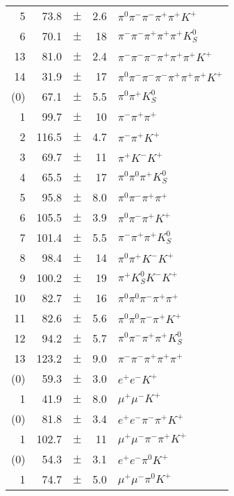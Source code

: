 \begin{center}
\begin{tabular}{|rrcrl|}
5       & 73.8  & $\pm$ & 2.6   & $\pi^0 \pi^- \pi^- \pi^+ \pi^+ K^+ $ \\
6       & 70.1  & $\pm$ & 18    & $\pi^- \pi^- \pi^+ \pi^+ \pi^+ K_S^0 $ \\
13      & 81.0  & $\pm$ & 2.4   & $\pi^- \pi^- \pi^- \pi^+ \pi^+ \pi^+ K^+ $ \\
14      & 31.9  & $\pm$ & 17    & $\pi^0 \pi^- \pi^- \pi^- \pi^+ \pi^+ \pi^+ K^+ $ \\
\hline                     
[15](0) & 67.1  & $\pm$ & 5.5   & $\pi^0 \pi^+ K_S^0 $ \\
1       & 99.7  & $\pm$ & 10    & $\pi^- \pi^+ \pi^+ $ \\
2       &116.5  & $\pm$ & 4.7   & $\pi^- \pi^+ K^+ $ \\
3       & 69.7  & $\pm$ & 11    & $\pi^+ K^- K^+ $ \\
4       & 65.5  & $\pm$ & 17    & $\pi^0 \pi^0 \pi^+ K_S^0 $ \\
5       & 95.8  & $\pm$ & 8.0   & $\pi^0 \pi^- \pi^+ \pi^+ $ \\
6       &105.5  & $\pm$ & 3.9   & $\pi^0 \pi^- \pi^+ K^+ $ \\
7       &101.4  & $\pm$ & 5.5   & $\pi^- \pi^+ \pi^+ K_S^0 $ \\
8       & 98.4  & $\pm$ & 14    & $\pi^0 \pi^+ K^- K^+ $ \\
9       &100.2  & $\pm$ & 19    & $\pi^+ K_S^0 K^- K^+ $ \\
10      & 82.7  & $\pm$ & 16    & $\pi^0 \pi^0 \pi^- \pi^+ \pi^+ $ \\
11      & 82.6  & $\pm$ & 5.6   & $\pi^0 \pi^0 \pi^- \pi^+ K^+ $ \\
12      & 94.2  & $\pm$ & 5.7   & $\pi^0 \pi^- \pi^+ \pi^+ K_S^0 $ \\
13      &123.2  & $\pm$ & 9.0   & $\pi^- \pi^- \pi^+ \pi^+ \pi^+ $ \\
\hline                     
[25](0) & 59.3  & $\pm$ & 3.0   & $e^+ e^- K^+ $ \\
1       & 41.9  & $\pm$ & 8.0   &  $\mu^+ \mu^- K^+ $\\
\hline                     
[26](0) & 81.8  & $\pm$ & 3.4   & $e^+ e^- \pi^- \pi^+ K^+ $\\
1       &102.7  & $\pm$ & 11    & $\mu^+ \mu^- \pi^- \pi^+ K^+ $ \\
\hline                     
[27](0) & 54.3  & $\pm$ & 3.1   & $e^+ e^- \pi^0 K^+ $ \\
1       & 74.7  & $\pm$ & 5.0   & $\mu^+ \mu^- \pi^0 K^+ $\\

\end{tabular}
\end{center}
